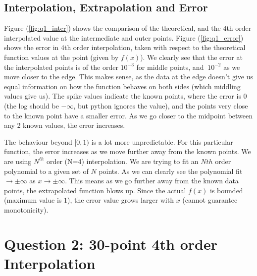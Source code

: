 \documentclass[paper=a4, fontsize=11pt]{scrartcl} %
\numberwithin{equation}{section} %
\numberwithin{figure}{section} %
\numberwithin{table}{section} %
\begin{document}
\subsection{Interpolation, Extrapolation and Error}

Figure (\ref{fig:q1_inter}) shows the comparison of the theoretical, and the 4th order interpolated value at the intermediate and outer points. Figure (\ref{fig:q1_error}) shows the error in 4th order interpolation, taken with respect to the theoretical function values at the point (given by $f(x)$). We clearly see that the error at the interpolated points is of the order $10^{-3}$ for middle points, and $~10^{-2}$ as we move closer to the edge. This makes sense, as the data at the edge doesn't give us equal information on how the function behaves on both sides (which middling values give us). The spike values indicate the known points, where the error is $0$ (the log should be $-\infty$, but python ignores the value), and the points very close to the known point have a smaller error. As we go closer to the midpoint between any 2 known values, the error increases. 

The behaviour beyond $[0,1)$ is a lot more unpredictable. For this particular function, the error increases as we move further away from the known points. We are using $N^{th}$ order (N=4) interpolation. We are trying to fit an $Nth$ order polynomial to a given set of $N$ points. As we can clearly see the polynomial fit $\to\pm\infty$ as $x\to\pm\infty$. This means as we go further away from the known data points, the extrapolated function blows up. Since the actual $f(x)$ is bounded (maximum value is $1$), the error value grows larger with $x$ (cannot guarantee monotonicity).

\section{Question 2: 30-point 4th order Interpolation} 
\end{document}
